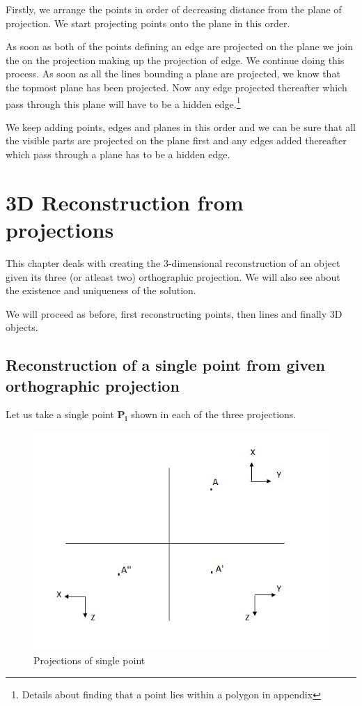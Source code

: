\documentclass[a4paper,11pt,openany]{book}
\begin{document}
Firstly, we arrange the points in order of decreasing distance from the plane of projection. We start projecting points onto the plane in this order.

As soon as both of the points defining an edge are projected on the plane we join the on the projection making up the projection of edge.
We continue doing this process. As soon as all the lines bounding a plane are projected, we know that the topmost plane has been projected. Now any edge projected thereafter which pass through this plane will have to be a hidden edge.\footnote{Details about finding that a point lies within a polygon in appendix}

We keep adding points, edges and planes in this order and we can be sure that all the visible parts are projected on the plane first and any edges added thereafter which pass through a plane has to be a hidden edge.

\chapter{3D Reconstruction from projections}
This chapter deals with creating the 3-dimensional reconstruction of an object given its three (or atleast two) orthographic projection. We will also see about the existence and uniqueness of the solution.

We will proceed as before, first reconstructing points, then lines and finally 3D objects.

\section{Reconstruction of a single point from given orthographic projection}
Let us take a single point $\boldsymbol{P_i}$ shown in each of the three projections. 

\begin{figure}[h]
\centering
\includegraphics[scale=0.5]{2dLabelswithPoint}
\caption{Projections of single point}
\end{figure}
\end{document}
